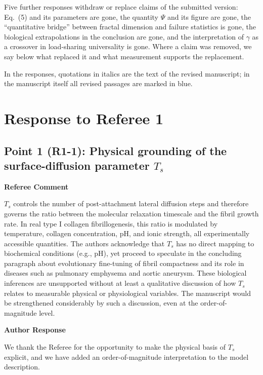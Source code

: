 \documentclass[11pt]{article}
\newenvironment{refereecomment}
  {%
    \par
    \begingroup
    \color{commentgray}
    \itshape
    \setlength{\leftskip}{1.4em}
    \setlength{\rightskip}{1.4em}
  }
  {%
    \par
    \endgroup
  }
\newcommand{\refereelabel}{%
  \par\smallskip
  {\color{commentgray}\bfseries Referee Comment}\par
}
\newcommand{\responselabel}{%
  \par\medskip
  {\color{responseblue}\bfseries Author Response}\par
}
\begin{document}
Five further responses withdraw or replace claims of the submitted version:
Eq.~(5) and its parameters are gone, the quantity $\Psi$ and its figure are
gone, the ``quantitative bridge'' between fractal dimension and failure
statistics is gone, the biological extrapolations in the conclusion are gone,
and the interpretation of $\gamma$ as a crossover in load-sharing universality
is gone. Where a claim was removed, we say below what replaced it and what
measurement supports the replacement.

In the responses, quotations in italics are the text of the revised manuscript;
in the manuscript itself all revised passages are marked in blue.

\clearpage

\section*{\LARGE Response to Referee 1}


\subsection*{Point 1 (R1-1): Physical grounding of the surface-diffusion parameter \(T_s\)}

\refereelabel
\begin{refereecomment}
  \(T_s\) controls the number of post-attachment lateral diffusion steps and
  therefore governs the ratio between the molecular relaxation timescale and the
  fibril growth rate. In real type I collagen fibrillogenesis, this ratio is
  modulated by temperature, collagen concentration, pH, and ionic strength, all
  experimentally accessible quantities. The authors acknowledge that \(T_s\) has
  no direct mapping to biochemical conditions (e.g., pH), yet proceed to
  speculate in the concluding paragraph about evolutionary fine-tuning of fibril
  compactness and its role in diseases such as pulmonary emphysema and aortic
  aneurysm. These biological inferences are unsupported without at least a
  qualitative discussion of how \(T_s\) relates to measurable physical or
  physiological variables. The manuscript would be strengthened considerably by
  such a discussion, even at the order-of-magnitude level.
\end{refereecomment}

\responselabel

We thank the Referee for the opportunity to make the physical basis of $T_s$
explicit, and we have added an order-of-magnitude interpretation to the model
description.
\end{document}
